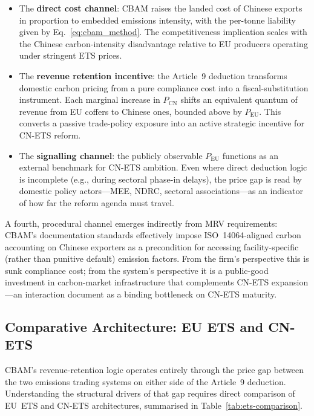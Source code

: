\documentclass[letterpaper, 10pt, conference]{ieeeconf}
\begin{document}
\begin{itemize}
  \item The \textbf{direct cost channel}: CBAM raises the landed
        cost of Chinese exports in proportion to embedded emissions
        intensity, with the per-tonne liability given by
        Eq.~\ref{eq:cbam_method}. The competitiveness implication
        scales with the Chinese carbon-intensity disadvantage relative
        to EU producers operating under stringent ETS prices.
  \item The \textbf{revenue retention incentive}: the Article~9
        deduction transforms domestic carbon pricing from a pure
        compliance cost into a fiscal-substitution instrument. Each
        marginal increase in $P_{\mathrm{CN}}$ shifts an equivalent
        quantum of revenue from EU coffers to Chinese ones, bounded
        above by $P_{\mathrm{EU}}$. This converts a passive
        trade-policy exposure into an active strategic incentive for
        CN-ETS reform.
  \item The \textbf{signalling channel}: the publicly observable
        $P_{\mathrm{EU}}$ functions as an external benchmark for
        CN-ETS ambition. Even where direct deduction logic is
        incomplete (e.g., during sectoral phase-in delays), the price
        gap is read by domestic policy actors---MEE, NDRC, sectoral
        associations---as an indicator of how far the reform agenda
        must travel.
\end{itemize}

A fourth, procedural channel emerges indirectly from MRV requirements:
CBAM's documentation standards effectively impose ISO~14064-aligned
carbon accounting on Chinese exporters as a precondition for accessing
facility-specific (rather than punitive default) emission factors.
From the firm's perspective this is sunk compliance cost; from the
system's perspective it is a public-good investment in carbon-market
infrastructure that complements CN-ETS expansion---an interaction
\citet{Dai2025} document as a binding bottleneck on CN-ETS maturity.

\subsection{Comparative Architecture: EU ETS and CN-ETS}
\label{sec:ets-comparison}

CBAM's revenue-retention logic operates entirely through the price gap
between the two emissions trading systems on either side of the
Article~9 deduction. Understanding the structural drivers of that gap
requires direct comparison of EU~ETS and CN-ETS architectures,
summarised in Table~\ref{tab:ets-comparison}.
\end{document}
